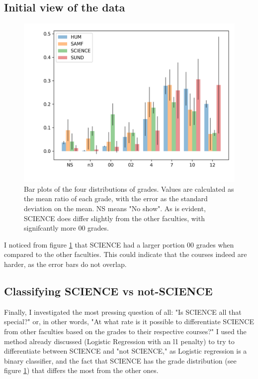 \documentclass[%
 reprint,
 amsmath,amssymb,
 aps,
]{revtex4-1}
\begin{document}
\subsection{Initial view of the data}
\begin{figure}[H]
  \includegraphics[width=\linewidth]{../figs/overlay.png}
  \caption{Bar plots of the four distributions of grades.
  Values are calculated as the mean ratio of each grade, with the error as the standard deviation on the mean.
  NS means "No show".
  As is evident, SCIENCE does differ slightly from the other faculties, with signifcantly more 00 grades.}
  \label{overlayKU}
\end{figure}
I noticed from figure \ref{overlayKU} that SCIENCE had a larger portion 00 grades when compared to the other faculties.
This could indicate that the courses indeed are harder, as the error bars do not overlap.


\subsection{Classifying SCIENCE vs not-SCIENCE}
Finally, I investigated the most pressing question of all: "Is SCIENCE all that special?" or, in other words, "At what rate is it possible to differentiate SCIENCE from other faculties based on the grades to their respective courses?"
I used the method already discussed (Logistic Regression with an l1 penalty) to try to differentiate between SCIENCE and "not SCIENCE," as Logistic regression is a binary classifier, and the fact that SCIENCE has the grade distribution (see figure \ref{overlayKU}) that differs the most from the other ones.
\end{document}
